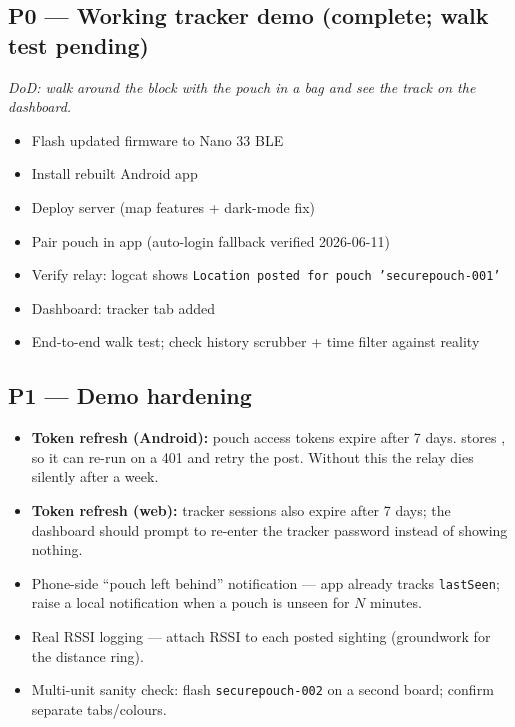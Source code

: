 \documentclass[11pt,a4paper]{article}
\newcommand{\done}{$\boxtimes$}
\newcommand{\todo}{$\square$}
\begin{document}
\subsection{P0 --- Working tracker demo (complete; walk test pending)}

\emph{DoD: walk around the block with the pouch in a bag and see the track on the dashboard.}

\begin{itemize}
  \item[\done] Flash updated firmware to Nano 33 BLE
  \item[\done] Install rebuilt Android app
  \item[\done] Deploy server (map features + dark-mode fix)
  \item[\done] Pair pouch in app (auto-login fallback verified 2026-06-11)
  \item[\done] Verify relay: logcat shows \texttt{Location posted for pouch 'securepouch-001'}
  \item[\done] Dashboard: tracker tab added
  \item[\todo] End-to-end walk test; check history scrubber + time filter against reality
\end{itemize}

\subsection{P1 --- Demo hardening}

\begin{itemize}
  \item[\todo] \textbf{Token refresh (Android):} pouch access tokens expire after 7 days.  stores , so it can re-run  on a 401 and retry the post. Without this the relay dies silently after a week.
  \item[\todo] \textbf{Token refresh (web):} tracker sessions also expire after 7 days; the dashboard should prompt to re-enter the tracker password instead of showing nothing.
  \item[\todo] Phone-side ``pouch left behind'' notification --- app already tracks \texttt{lastSeen}; raise a local notification when a pouch is unseen for $N$ minutes.
  \item[\todo] Real RSSI logging --- attach RSSI to each posted sighting (groundwork for the distance ring).
  \item[\todo] Multi-unit sanity check: flash \texttt{securepouch-002} on a second board; confirm separate tabs/colours.
\end{itemize}
\end{document}
